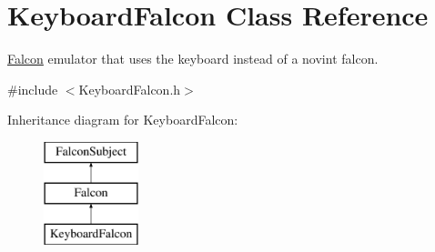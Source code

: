 \hypertarget{classKeyboardFalcon}{
\section{KeyboardFalcon Class Reference}
\label{classKeyboardFalcon}
}


\hyperlink{classFalcon}{Falcon} emulator that uses the keyboard instead of a novint falcon.  




{\ttfamily \#include $<$KeyboardFalcon.h$>$}

Inheritance diagram for KeyboardFalcon:\begin{figure}[H]
\begin{center}
\leavevmode
\includegraphics[height=3.000000cm]{classKeyboardFalcon}
\end{center}
\end{figure}
